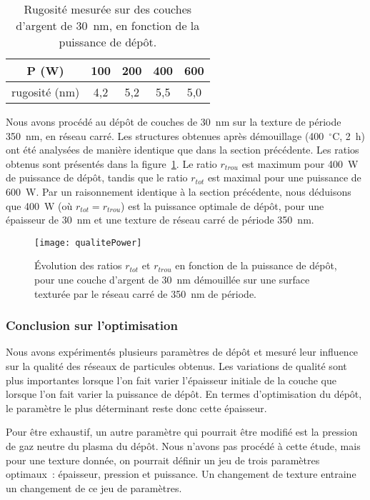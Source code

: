 \begin{table}[!htb]
\centering
\begin{tabular}{ccccc}
\hline
P (W) & 100 & 200 & 400 & 600 \\
\hline
rugosité (nm) & 4,2 & 5,2 & 5,5 & 5,0\\
\hline
\end{tabular}
\caption{Rugosité mesurée sur des couches d'argent de 30~nm, en fonction de la puissance de dépôt.}
\label{tRguoPower}
\end{table}
Nous avons procédé au dépôt de couches de 30~nm sur la texture de période 350~nm, en réseau carré. Les structures obtenues après démouillage (400~$^\circ$C, 2~h) ont été analysées de manière identique que dans la section précédente. Les ratios obtenus sont présentés dans la figure~\ref{qualitePower}. Le ratio $r_{trou}$ est maximum pour 400~W de puissance de dépôt, tandis que le ratio $r_{tot}$ est maximal pour une puissance de 600~W. Par un raisonnement identique à la section précédente, nous déduisons que 400~W (où $r_{tot}=r_{trou}$) est la puissance optimale de dépôt, pour une épaisseur de 30~nm et une texture de réseau carré de période 350~nm.\par 
\begin{figure}[!htb]
\centering
\texttt{[image: qualitePower]}
\caption{Évolution des ratios $r_{tot}$ et $r_{trou}$ en fonction de la puissance de dépôt, pour une couche d'argent de 30~nm démouillée sur une surface texturée par le réseau carré de 350~nm de période.}
\label{qualitePower}
\end{figure}

\subsubsection{Conclusion sur l'optimisation}
Nous avons expérimentés plusieurs paramètres de dépôt et mesuré leur influence sur la qualité des réseaux de particules obtenus. Les variations de qualité sont plus importantes lorsque l'on fait varier l'épaisseur initiale de la couche que lorsque l'on fait varier la puissance de dépôt. En termes d'optimisation du dépôt, le paramètre le plus déterminant reste donc  cette épaisseur.\par 
Pour être exhaustif, un autre paramètre qui pourrait être modifié est la pression de gaz neutre du plasma du dépôt. Nous n'avons pas procédé à cette étude, mais pour une texture donnée, on pourrait définir un jeu de trois paramètres optimaux~: épaisseur, pression et puissance. Un changement de texture entraine un changement de ce jeu de paramètres.\par 

